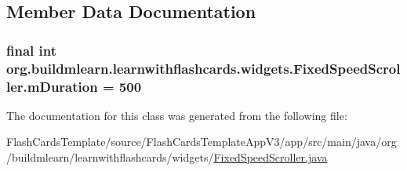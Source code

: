 \subsection{Member Data Documentation}
\subsubsection[{\texorpdfstring{m\+Duration}{mDuration}}]{\setlength{\rightskip}{0pt plus 5cm}final int org.\+buildmlearn.\+learnwithflashcards.\+widgets.\+Fixed\+Speed\+Scroller.\+m\+Duration = 500\hspace{0.3cm}{\ttfamily [private]}}\hypertarget{classorg_1_1buildmlearn_1_1learnwithflashcards_1_1widgets_1_1FixedSpeedScroller_a15043b1def9f252e7efc3aa99117d9bc}{}\label{classorg_1_1buildmlearn_1_1learnwithflashcards_1_1widgets_1_1FixedSpeedScroller_a15043b1def9f252e7efc3aa99117d9bc}


The documentation for this class was generated from the following file\+:\begin{DoxyCompactItemize}
\item 
Flash\+Cards\+Template/source/\+Flash\+Cards\+Template\+App\+V3/app/src/main/java/org/buildmlearn/learnwithflashcards/widgets/\hyperlink{FixedSpeedScroller_8java}{Fixed\+Speed\+Scroller.\+java}\end{DoxyCompactItemize}
